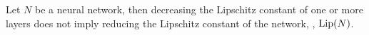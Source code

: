 \begin{proposition} \label{proposition:ch3-limit_bound_lipschitz}
  Let $N$ be a neural network, then decreasing the Lipschitz constant of one or more layers does not imply reducing the Lipschitz constant of the network, \ie, $\lip{N}$.
\end{proposition}




